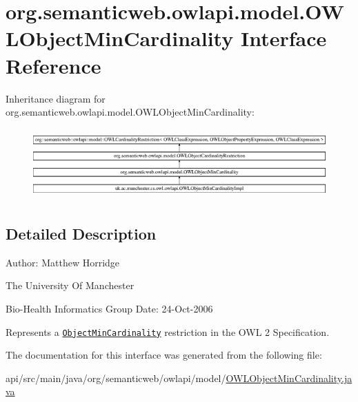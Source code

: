\hypertarget{interfaceorg_1_1semanticweb_1_1owlapi_1_1model_1_1_o_w_l_object_min_cardinality}{\section{org.\-semanticweb.\-owlapi.\-model.\-O\-W\-L\-Object\-Min\-Cardinality Interface Reference}
\label{interfaceorg_1_1semanticweb_1_1owlapi_1_1model_1_1_o_w_l_object_min_cardinality}
}
Inheritance diagram for org.\-semanticweb.\-owlapi.\-model.\-O\-W\-L\-Object\-Min\-Cardinality\-:\begin{figure}[H]
\begin{center}
\leavevmode
\includegraphics[height=2.758621cm]{interfaceorg_1_1semanticweb_1_1owlapi_1_1model_1_1_o_w_l_object_min_cardinality}
\end{center}
\end{figure}


\subsection{Detailed Description}
Author\-: Matthew Horridge\par
 The University Of Manchester\par
 Bio-\/\-Health Informatics Group Date\-: 24-\/\-Oct-\/2006 

Represents a \href{http://www.w3.org/TR/2009/REC-owl2-syntax-20091027/#Minimum_Cardinality}{\tt Object\-Min\-Cardinality} restriction in the O\-W\-L 2 Specification. 

The documentation for this interface was generated from the following file\-:\begin{DoxyCompactItemize}
\item 
api/src/main/java/org/semanticweb/owlapi/model/\hyperlink{_o_w_l_object_min_cardinality_8java}{O\-W\-L\-Object\-Min\-Cardinality.\-java}\end{DoxyCompactItemize}
